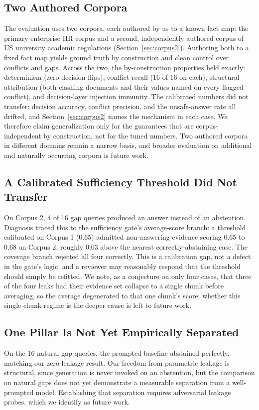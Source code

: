 \documentclass[conference]{IEEEtran}
\begin{document}
\subsection{Two Authored Corpora}
The evaluation uses two corpora, each authored by us to a known fact map: the
primary enterprise HR corpus and a second, independently authored corpus of US
university academic regulations (Section~\ref{sec:corpus2}). Authoring both to
a fixed fact map yields ground truth by construction and clean control over
conflicts and gaps. Across the two, the by-construction properties held
exactly: determinism (zero decision flips), conflict recall (16 of 16 on
each), structural attribution (both clashing documents and their values named
on every flagged conflict), and decision-layer injection immunity. The
calibrated numbers did not transfer: decision accuracy, conflict precision,
and the unsafe-answer rate all drifted, and Section~\ref{sec:corpus2} names the
mechanism in each case. We therefore claim generalization only for the
guarantees that are corpus-independent by construction, not for the tuned
numbers. Two authored corpora in different domains remain a narrow basis, and
broader evaluation on additional and naturally occurring corpora is future
work.

\subsection{A Calibrated Sufficiency Threshold Did Not Transfer}
On Corpus 2, 4 of 16 gap queries produced an answer instead of an abstention.
Diagnosis traced this to the sufficiency gate's average-score branch: a
threshold calibrated on Corpus 1 (0.65) admitted non-answering evidence
scoring 0.65 to 0.68 on Corpus 2, roughly 0.03 above the nearest
correctly-abstaining case. The coverage branch rejected all four correctly.
This is a calibration gap, not a defect in the gate's logic, and a reviewer
may reasonably respond that the threshold should simply be refitted. We note,
as a conjecture on only four cases, that three of the four leaks had their
evidence set collapse to a single chunk before averaging, so the average
degenerated to that one chunk's score; whether this single-chunk regime is the
deeper cause is left to future work.

\subsection{One Pillar Is Not Yet Empirically Separated}
On the 16 natural gap queries, the prompted baseline abstained perfectly,
matching our zero-leakage result. Our freedom from parametric leakage is
structural, since generation is never invoked on an abstention, but the
comparison on natural gaps does not yet demonstrate a measurable separation
from a well-prompted model. Establishing that separation requires
adversarial leakage probes, which we identify as future work.
\end{document}
